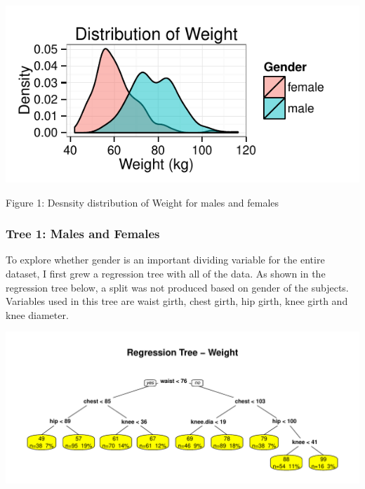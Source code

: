\documentclass[11pt]{article}\usepackage[]{graphicx}\usepackage[]{color}
\makeatletter
\def\maxwidth{ %
  \ifdim\Gin@nat@width>\linewidth
    \linewidth
  \else
    \Gin@nat@width
  \fi
}
\newenvironment{knitrout}{}{} %
\makeatother
\begin{document}
\begin{center}
\begin{knitrout}
\color{fgcolor}
\includegraphics[width=\maxwidth]{figure/wdt} 

\end{knitrout}

\vspace{-10pt}
\caption{Figure 1: Desnsity distribution of Weight for males and females}
\end{center}

\subsubsection{Tree 1: Males and Females} 
To explore whether gender is an important dividing variable for the entire dataset, I first grew a regression tree with all of the data. As shown in the regression tree below, a split was not produced based on gender of the subjects. Variables used in this tree are waist girth, chest girth, hip girth, knee girth and knee diameter.

\begin{knitrout}
\color{fgcolor}
\includegraphics[width=\maxwidth]{figure/wt} 

\end{knitrout}
\end{document}
